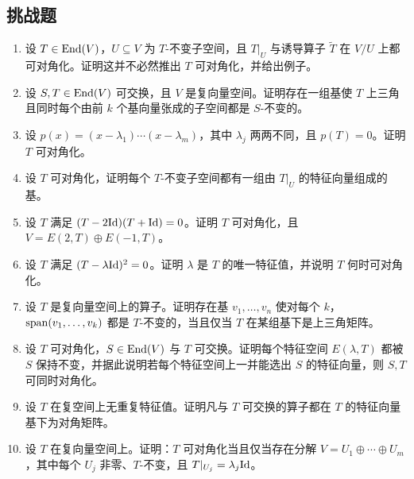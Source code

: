 \subsection*{挑战题}
\begin{enumerate}[resume, label=\textbf{\arabic*.}, leftmargin=*, itemsep=0.5em]
\item \hard 设 $T\in\mathrm{End}(V)$，$U\subseteq V$ 为 $T$-不变子空间，且 $T|_U$ 与诱导算子 $\widetilde T$ 在 $V/U$ 上都可对角化。证明这并不必然推出 $T$ 可对角化，并给出例子。
\item \hard 设 $S,T\in\mathrm{End}(V)$ 可交换，且 $V$ 是复向量空间。证明存在一组基使 $T$ 上三角且同时每个由前 $k$ 个基向量张成的子空间都是 $S$-不变的。
\item \hard 设 $p(x)=(x-\lambda_1)\cdots(x-\lambda_m)$，其中 $\lambda_j$ 两两不同，且 $p(T)=0$。证明 $T$ 可对角化。
\item \hard 设 $T$ 可对角化，证明每个 $T$-不变子空间都有一组由 $T|_U$ 的特征向量组成的基。
\item \hard 设 $T$ 满足 $(T-2\mathrm{Id})(T+\mathrm{Id})=0$。证明 $T$ 可对角化，且 $V=E(2,T)\oplus E(-1,T)$。
\item \hard 设 $T$ 满足 $(T-\lambda\mathrm{Id})^2=0$。证明 $\lambda$ 是 $T$ 的唯一特征值，并说明 $T$ 何时可对角化。
\item \hard 设 $T$ 是复向量空间上的算子。证明存在基 $v_1,\dots,v_n$ 使对每个 $k$，$\operatorname{span}(v_1,\dots,v_k)$ 都是 $T$-不变的，当且仅当 $T$ 在某组基下是上三角矩阵。
\item \hard 设 $T$ 可对角化，$S\in\mathrm{End}(V)$ 与 $T$ 可交换。证明每个特征空间 $E(\lambda,T)$ 都被 $S$ 保持不变，并据此说明若每个特征空间上一并能选出 $S$ 的特征向量，则 $S,T$ 可同时对角化。
\item \hard 设 $T$ 在复空间上无重复特征值。证明凡与 $T$ 可交换的算子都在 $T$ 的特征向量基下为对角矩阵。
\item \hard 设 $T$ 在复向量空间上。证明：$T$ 可对角化当且仅当存在分解 $V=U_1\oplus\cdots\oplus U_m$，其中每个 $U_j$ 非零、$T$-不变，且 $T|_{U_j}=\lambda_j\mathrm{Id}$。
\end{enumerate}

